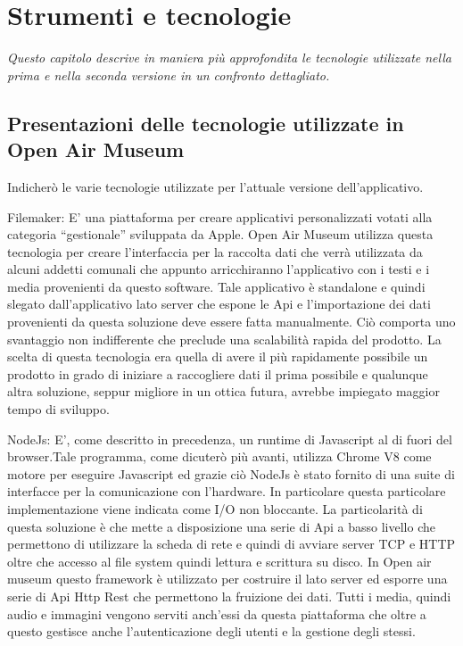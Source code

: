 \chapter{Strumenti e tecnologie}
\label{cha:intro}
\vspace{5mm}

\emph{Questo capitolo descrive in maniera più approfondita le tecnologie utilizzate nella prima e nella seconda versione in un confronto dettagliato.}

\section{Presentazioni delle tecnologie utilizzate in Open Air Museum}\vspace{5mm}
Indicherò le varie tecnologie utilizzate per l'attuale versione dell'applicativo.

\vspace{5mm}Filemaker: E’ una piattaforma per creare applicativi personalizzati votati alla categoria “gestionale” sviluppata da Apple. Open Air Museum utilizza questa tecnologia per creare l’interfaccia per la raccolta dati che verrà utilizzata da alcuni addetti comunali che appunto arricchiranno l’applicativo con i testi e i media provenienti da questo software. Tale applicativo è standalone e quindi slegato dall’applicativo lato server che espone le Api e l’importazione dei dati provenienti da questa soluzione deve essere fatta manualmente. Ciò comporta uno svantaggio non indifferente che preclude una scalabilità rapida del prodotto. La scelta di questa tecnologia era quella di avere il più rapidamente possibile un prodotto in grado di iniziare a raccogliere dati il prima possibile e qualunque altra soluzione, seppur migliore in un ottica futura, avrebbe impiegato maggior tempo di sviluppo.\vspace{5mm}

	NodeJs: E’, come descritto in precedenza, un runtime di Javascript al di fuori del browser.Tale programma, come dicuterò più avanti, utilizza Chrome V8\cite{V8} come motore per eseguire Javascript ed grazie ciò NodeJs è stato fornito di una suite di interfacce per la comunicazione con l'hardware. In particolare questa particolare implementazione viene indicata come I/O non bloccante\cite{AsincIO}. La particolarità di questa soluzione è che mette a disposizione una serie di Api a basso livello che permettono di utilizzare la scheda di rete e quindi di avviare server TCP e HTTP oltre che accesso al file system quindi lettura e scrittura su disco. In Open air museum questo framework è utilizzato per costruire il lato server ed esporre una serie di Api Http Rest che permettono la fruizione dei dati. Tutti i media, quindi audio e immagini vengono serviti anch’essi da questa piattaforma che oltre a questo gestisce anche l’autenticazione degli utenti e la gestione degli stessi. \vspace{5mm}

